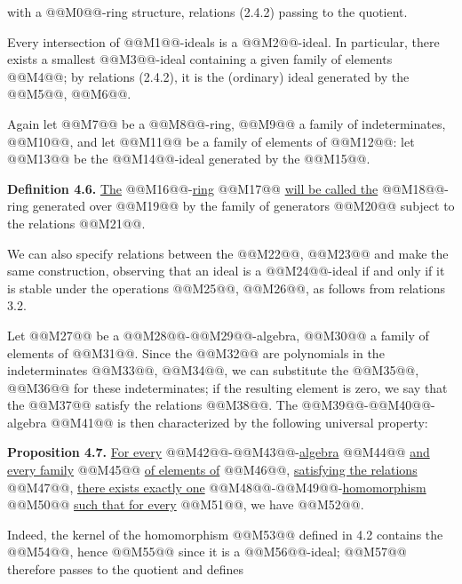 with a @@M0@@-ring structure, relations (2.4.2) passing to the quotient.

Every intersection of @@M1@@-ideals is a @@M2@@-ideal. In particular, there exists a smallest @@M3@@-ideal containing a given family of elements @@M4@@; by relations (2.4.2), it is the (ordinary) ideal generated by the @@M5@@, @@M6@@.

Again let @@M7@@ be a @@M8@@-ring, @@M9@@ a family of indeterminates, @@M10@@, and let @@M11@@ be a family of elements of @@M12@@: let @@M13@@ be the @@M14@@-ideal generated by the @@M15@@.

\textbf{Definition 4.6.} \uline{The} @@M16@@-\uline{ring} @@M17@@ \uline{will be called the} @@M18@@-ring generated over @@M19@@ by the family of generators @@M20@@ subject to the relations @@M21@@.

We can also specify relations between the @@M22@@, @@M23@@ and make the same construction, observing that an ideal is a @@M24@@-ideal if and only if it is stable under the operations @@M25@@, @@M26@@, as follows from relations 3.2.

Let @@M27@@ be a @@M28@@-@@M29@@-algebra, @@M30@@ a family of elements of @@M31@@. Since the @@M32@@ are polynomials in the indeterminates @@M33@@, @@M34@@, we can substitute the @@M35@@, @@M36@@ for these indeterminates; if the resulting element is zero, we say that the @@M37@@ satisfy the relations @@M38@@. The @@M39@@-@@M40@@-algebra @@M41@@ is then characterized by the following universal property:

\textbf{Proposition 4.7.} \uline{For every} @@M42@@-@@M43@@-\uline{algebra} @@M44@@ \uline{and every family} @@M45@@ \uline{of elements of} @@M46@@, \uline{satisfying the relations} @@M47@@, \uline{there exists exactly one} @@M48@@-@@M49@@-\uline{homomorphism} @@M50@@ \uline{such that for every} @@M51@@, we have @@M52@@.

Indeed, the kernel of the homomorphism @@M53@@ defined in 4.2 contains the @@M54@@, hence @@M55@@ since it is a @@M56@@-ideal; @@M57@@ therefore passes to the quotient and defines
